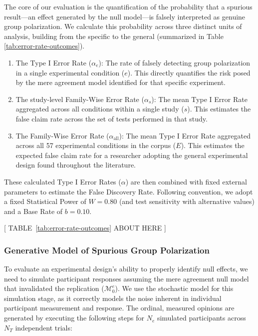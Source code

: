 \documentclass[preview]{article}
\newcommand{\nullmodel}{\mathcal{M}_0}
\begin{document}
The core of our evaluation is the quantification of the probability that
a spurious result---an effect generated by the null model---is falsely
interpreted as genuine group polarization. We calculate this probability
across three distinct units of analysis, building from the specific to
the general (summarized in Table \ref{tab:error-rate-outcomes}).

\begin{enumerate}
\def\labelenumi{\arabic{enumi}.}
\item
  The Type I Error Rate ($\alpha_e$): The rate of falsely detecting
  group polarization in a single experimental condition ($e$). This
  directly quantifies the risk posed by the mere agreement model
  identified for that specific experiment.
\item
  The study-level Family-Wise Error Rate ($\alpha_s$): The mean Type I
  Error Rate aggregated across all conditions within a single study
  ($s$). This estimates the false claim rate across the set of tests
  performed in that study.
\item
  The Family-Wise Error Rate ($\alpha_{\text{all}}$): The mean Type I
  Error Rate aggregated across all 57 experimental conditions in the
  corpus ($E$). This estimates the expected false claim rate for a
  researcher adopting the general experimental design found throughout
  the literature.
\end{enumerate}

These calculated Type I Error Rates ($\alpha$) are then combined with
fixed external parameters to estimate the False Discovery Rate.
Following convention, we adopt a fixed Statistical Power of $W=0.80$
(and test sensitivity with alternative values) and a Base Rate of
$b=0.10$. 

\begin{center}
  [ TABLE~\ref{tab:error-rate-outcomes} ABOUT HERE ]
\end{center}

\subsubsection{Generative Model of Spurious Group
Polarization}\label{generative-model-of-spurious-group-polarization}

To evaluate an experimental design's ability to properly identify null
effects, we need to simulate participant responses assuming the mere
agreement null model that invalidated the replication ($\nullmodel^e$). We
use the stochastic model for this simulation stage, as it correctly
models the noise inherent in individual participant measurement and
response. The ordinal, measured opinions are generated by executing the
following steps for $N_e$ simulated participants across $N_T$
independent trials:
\end{document}
